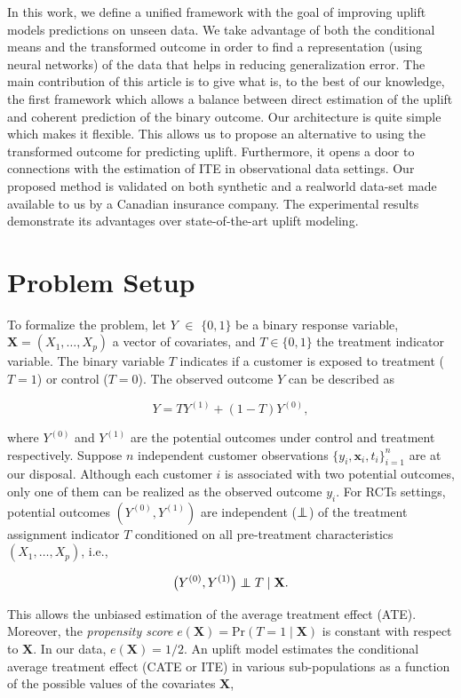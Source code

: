 \documentclass{article}
\newcommand\independent{\protect\mathpalette{\protect\independenT}{\perp}}
\def\independenT#1#2{\mathrel{\rlap{$#1#2$}\mkern2mu{#1#2}}}
\def\X{\mathbf X}
\begin{document}
In this work, we define a unified framework with the goal of improving uplift models predictions on unseen data. We take advantage of both the conditional means and the transformed outcome in order to find a representation (using neural networks) of the data that helps in reducing generalization error. 
The main contribution of this article is to give what is, to the best of our knowledge, the first framework which allows a balance between direct estimation of the uplift and coherent prediction of the binary outcome. Our architecture is quite simple which makes it flexible. This allows us to propose an alternative to using the transformed outcome for predicting uplift. Furthermore, it opens a door to connections with the estimation of ITE in observational data settings. Our proposed method is validated on both synthetic and a realworld data-set made available to us by a Canadian insurance company. The experimental results demonstrate its advantages over state-of-the-art uplift modeling.

\section{Problem Setup}
\label{setup}

To formalize the problem, let $Y$ $\in$ $\lbrace0,1\rbrace$ be a binary response variable, $\textbf{X}=(X_{1},\ldots,X_{p})$ a vector of covariates, and $T\in\lbrace0,1\rbrace$ the treatment indicator variable. The binary variable $T$ indicates if a customer is exposed to treatment ($T=1$) or control ($T=0$). The observed outcome $Y$ can be described as 

$$Y=TY^{(1)} + (1-T)Y^{(0)},$$

where $Y^{(0)}$  and $Y^{(1)}$ are the potential outcomes under control and treatment respectively. Suppose $n$ independent customer observations $\{y_i, \textbf{x}_i, t_i\}_{i=1}^n$ are at our disposal. Although each customer $i$ is associated with two potential outcomes, only one of them can be realized as the observed outcome $y_i$. For RCTs settings, potential outcomes $(Y^{(0)},Y^{(1)})$ are independent ($\independent$) of the treatment assignment indicator $T$ conditioned on all pre-treatment characteristics $(X_1, \ldots, X_p)$, i.e.,

\begin{equation}
    \big( Y^{(0)}, Y^{(1)} \big) \independent T \mid \X. 
    \label{eq:randomization}
\end{equation}

This allows the unbiased estimation of the average treatment effect (ATE). Moreover, the \textit{propensity score} $e(\X)= \mathrm{Pr}(T=1 \mid \X)$ is constant with respect to $\X$. In our data, $e(\X) = 1/2$. An uplift model estimates the conditional average treatment effect (CATE or ITE) in various sub-populations as a function of the possible values of the covariates $\X$,
\end{document}
